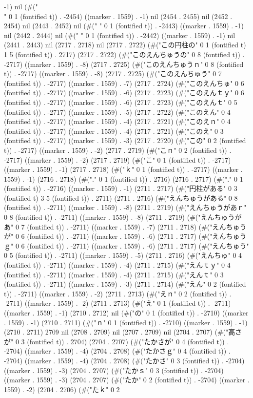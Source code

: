 {-1) nil (#("\\" 0 1 (fontified t)) . -2454) ((marker . 1559) . -1) nil (2454 . 2455) nil (2452 . 2454) nil (2443 . 2452) nil (#(" " 0 1 (fontified t)) . -2443) ((marker . 1559) . -1) nil (2442 . 2444) nil (#(" " 0 1 (fontified t)) . -2442) ((marker . 1559) . -1) nil (2441 . 2443) nil (2717 . 2718) nil (2717 . 2722) (#("この円柱の" 0 1 (fontified t) 1 5 (fontified t)) . 2717) (2717 . 2722) (#("このえんちゅうの" 0 8 (fontified t)) . -2717) ((marker . 1559) . -8) (2717 . 2725) (#("このえんちゅうｎ" 0 8 (fontified t)) . -2717) ((marker . 1559) . -8) (2717 . 2725) (#("このえんちゅう" 0 7 (fontified t)) . -2717) ((marker . 1559) . -7) (2717 . 2724) (#("このえんちゅ" 0 6 (fontified t)) . -2717) ((marker . 1559) . -6) (2717 . 2723) (#("このえんｔｙ" 0 6 (fontified t)) . -2717) ((marker . 1559) . -6) (2717 . 2723) (#("このえんｔ" 0 5 (fontified t)) . -2717) ((marker . 1559) . -5) (2717 . 2722) (#("このえん" 0 4 (fontified t)) . -2717) ((marker . 1559) . -4) (2717 . 2721) (#("このえｎ" 0 4 (fontified t)) . -2717) ((marker . 1559) . -4) (2717 . 2721) (#("このえ" 0 3 (fontified t)) . -2717) ((marker . 1559) . -3) (2717 . 2720) (#("この" 0 2 (fontified t)) . -2717) ((marker . 1559) . -2) (2717 . 2719) (#("こｎ" 0 2 (fontified t)) . -2717) ((marker . 1559) . -2) (2717 . 2719) (#("こ" 0 1 (fontified t)) . -2717) ((marker . 1559) . -1) (2717 . 2718) (#("ｋ" 0 1 (fontified t)) . -2717) ((marker . 1559) . -1) (2716 . 2718) (#("." 0 1 (fontified t)) . 2716) (2716 . 2717) (#("." 0 1 (fontified t)) . -2716) ((marker . 1559) . -1) (2711 . 2717) (#("円柱がある" 0 3 (fontified t) 3 5 (fontified t)) . 2711) (2711 . 2716) (#("えんちゅうがある" 0 8 (fontified t)) . -2711) ((marker . 1559) . -8) (2711 . 2719) (#("えんちゅうがあｒ" 0 8 (fontified t)) . -2711) ((marker . 1559) . -8) (2711 . 2719) (#("えんちゅうがあ" 0 7 (fontified t)) . -2711) ((marker . 1559) . -7) (2711 . 2718) (#("えんちゅうが" 0 6 (fontified t)) . -2711) ((marker . 1559) . -6) (2711 . 2717) (#("えんちゅうｇ" 0 6 (fontified t)) . -2711) ((marker . 1559) . -6) (2711 . 2717) (#("えんちゅう" 0 5 (fontified t)) . -2711) ((marker . 1559) . -5) (2711 . 2716) (#("えんちゅ" 0 4 (fontified t)) . -2711) ((marker . 1559) . -4) (2711 . 2715) (#("えんｔｙ" 0 4 (fontified t)) . -2711) ((marker . 1559) . -4) (2711 . 2715) (#("えんｔ" 0 3 (fontified t)) . -2711) ((marker . 1559) . -3) (2711 . 2714) (#("えん" 0 2 (fontified t)) . -2711) ((marker . 1559) . -2) (2711 . 2713) (#("えｎ" 0 2 (fontified t)) . -2711) ((marker . 1559) . -2) (2711 . 2713) (#("え" 0 1 (fontified t)) . -2711) ((marker . 1559) . -1) (2710 . 2712) nil (#("の" 0 1 (fontified t)) . -2710) ((marker . 1559) . -1) (2710 . 2711) (#("ｎ" 0 1 (fontified t)) . -2710) ((marker . 1559) . -1) (2710 . 2711) 2709 nil (2708 . 2709) nil (2707 . 2709) nil (2704 . 2707) (#("高さが" 0 3 (fontified t)) . 2704) (2704 . 2707) (#("たかさが" 0 4 (fontified t)) . -2704) ((marker . 1559) . -4) (2704 . 2708) (#("たかさｇ" 0 4 (fontified t)) . -2704) ((marker . 1559) . -4) (2704 . 2708) (#("たかさ" 0 3 (fontified t)) . -2704) ((marker . 1559) . -3) (2704 . 2707) (#("たかｓ" 0 3 (fontified t)) . -2704) ((marker . 1559) . -3) (2704 . 2707) (#("たか" 0 2 (fontified t)) . -2704) ((marker . 1559) . -2) (2704 . 2706) (#("たｋ" 0 2 }
